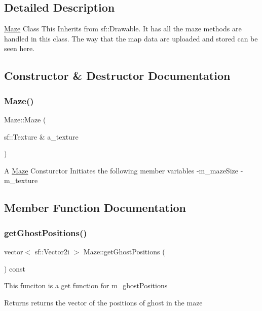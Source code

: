 \subsection{Detailed Description}
\hyperlink{class_maze}{Maze} Class This Inherits from sf\+::\+Drawable. It has all the maze methods are handled in this class. The way that the map data are uploaded and stored can be seen here. 

\subsection{Constructor \& Destructor Documentation}
\mbox{\label{class_maze_a7d8ebd5ec031891fcb2d76d5b8502e44}} 
\subsubsection{\texorpdfstring{Maze()}{Maze()}}
{\footnotesize\ttfamily Maze\+::\+Maze (\begin{DoxyParamCaption}\item[{sf\+::\+Texture \&}]{a\+\_\+texture }\end{DoxyParamCaption})}

A \hyperlink{class_maze}{Maze} Consturctor Initiates the following member variables -\/m\+\_\+maze\+Size -\/m\+\_\+texture 

\subsection{Member Function Documentation}
\mbox{\label{class_maze_aaf1dc338270b2674df3f5477a512b0a3}} 
\subsubsection{\texorpdfstring{get\+Ghost\+Positions()}{getGhostPositions()}}
{\footnotesize\ttfamily vector$<$ sf\+::\+Vector2i $>$ Maze\+::get\+Ghost\+Positions (\begin{DoxyParamCaption}{ }\end{DoxyParamCaption}) const}

This funciton is a get function for m\+\_\+ghost\+Positions

\begin{DoxyReturn}{Returns}
returns the vector of the positions of ghost in the maze 
\end{DoxyReturn}
\mbox{\label{class_maze_a663cb5481d68d68b8d0483d949a125d8}} 
